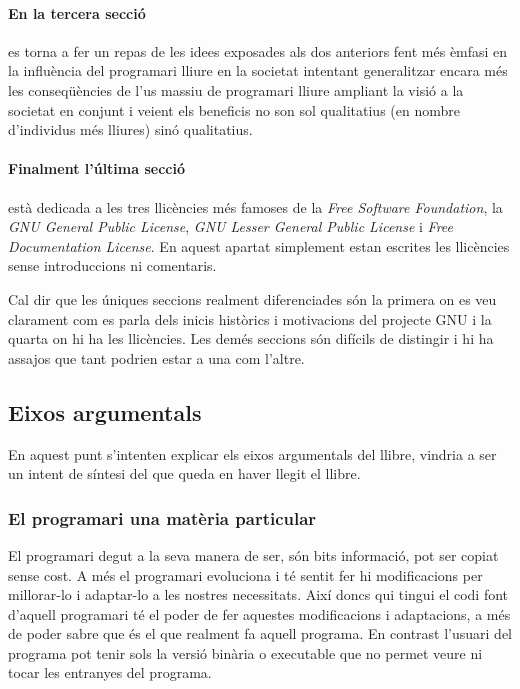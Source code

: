 \documentclass[a4paper,10pt]{scrartcl}
\begin{document}
\paragraph{En la tercera secció} es torna a fer un repas de les idees exposades
als dos anteriors fent més èmfasi en la influència del programari
lliure en la societat intentant generalitzar encara més les
conseqüències de l'us massiu de programari lliure ampliant la visió
a la societat en conjunt i veient els beneficis no son sol qualitatius
(en nombre d'individus més lliures) sinó qualitatius.

\paragraph{Finalment l'última secció} està dedicada a les tres llicències més famoses
de la \emph{Free Software Foundation}, la \emph{GNU General Public License},
\emph{GNU Lesser General Public License} i \emph{Free Documentation License}.
En aquest apartat simplement estan escrites les llicències sense introduccions ni comentaris.

Cal dir que les úniques seccions realment diferenciades són la primera on es veu
clarament com es parla dels inicis històrics i motivacions del projecte GNU i la quarta on hi ha les llicències.
Les demés seccions són difícils de distingir i hi ha assajos que tant podrien estar a una com l'altre.

\subsection{Eixos argumentals}
  
En aquest punt s'intenten explicar els eixos argumentals del llibre, vindria a ser un intent
de síntesi del que queda en haver llegit el llibre.

\subsubsection{El programari una matèria particular}
El programari degut a la seva manera de ser, són bits informació, pot ser copiat sense cost.
A més el programari evoluciona i té sentit fer hi modificacions per millorar-lo i adaptar-lo
a les nostres necessitats. Així doncs qui tingui el codi font d'aquell programari té el 
poder de fer aquestes modificacions i adaptacions, a més de poder sabre que és el que
realment fa aquell programa. En contrast l'usuari del programa pot tenir sols la versió
binària o executable que no permet veure ni tocar les entranyes del programa.
\end{document}
